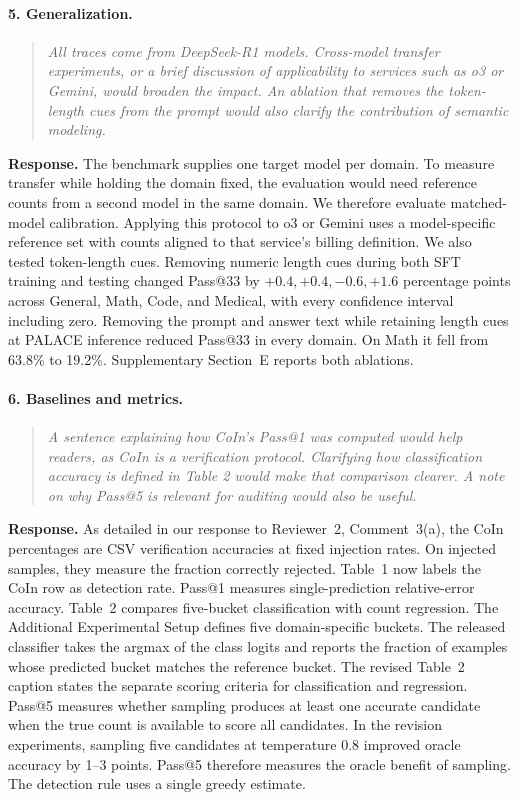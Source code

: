 \documentclass[11pt]{article}
\begin{document}
\paragraph{5. Generalization.}
\begin{quote}\small\itshape
All traces come from DeepSeek-R1 models. Cross-model transfer experiments, or a brief discussion of applicability to services such as o3 or Gemini, would broaden the impact. An ablation that removes the token-length cues from the prompt would also clarify the contribution of semantic modeling.
\end{quote}
\textbf{Response.} The benchmark supplies one target model per domain. To measure transfer while holding the domain fixed, the evaluation would need reference counts from a second model in the same domain. We therefore evaluate matched-model calibration. Applying this protocol to o3 or Gemini uses a model-specific reference set with counts aligned to that service's billing definition. We also tested token-length cues. Removing numeric length cues during both SFT training and testing changed Pass@33 by \(+0.4,+0.4,-0.6,+1.6\) percentage points across General, Math, Code, and Medical, with every confidence interval including zero. Removing the prompt and answer text while retaining length cues at PALACE inference reduced Pass@33 in every domain. On Math it fell from 63.8\% to 19.2\%. Supplementary Section~E reports both ablations.

\paragraph{6. Baselines and metrics.}
\begin{quote}\small\itshape
A sentence explaining how CoIn's Pass@1 was computed would help readers, as CoIn is a verification protocol. Clarifying how classification accuracy is defined in Table 2 would make that comparison clearer. A note on why Pass@5 is relevant for auditing would also be useful.
\end{quote}
\textbf{Response.} As detailed in our response to Reviewer~2, Comment~3(a), the CoIn percentages are CSV verification accuracies at fixed injection rates. On injected samples, they measure the fraction correctly rejected. Table~1 now labels the CoIn row as detection rate. Pass@1 measures single-prediction relative-error accuracy. Table~2 compares five-bucket classification with count regression. The Additional Experimental Setup defines five domain-specific buckets. The released classifier takes the argmax of the class logits and reports the fraction of examples whose predicted bucket matches the reference bucket. The revised Table~2 caption states the separate scoring criteria for classification and regression. Pass@5 measures whether sampling produces at least one accurate candidate when the true count is available to score all candidates. In the revision experiments, sampling five candidates at temperature 0.8 improved oracle accuracy by 1--3 points. Pass@5 therefore measures the oracle benefit of sampling. The detection rule uses a single greedy estimate.
\end{document}
